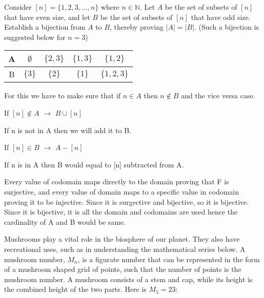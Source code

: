 \documentclass[addpoints]{exam}
\begin{document}
\begin{questions}
\begin{solution}
  
  
  
  
  \end{solution}

\question[15] Consider $[n] = \{1,2,3,...,n\}$ where $n \in \mathbb{N}$. Let $A$ be the set of subsets of $[n]$ that have even size, and let $B$ be the set of subsets of $[n]$ that have odd size. Establish a bijection from $A$ to $B$, thereby proving $|A| = |B|$. (Such a bijection is suggested below for $n = 3$) 

\begin{center}

  \begin{tabular}{ |c || c | c | c |c |}
    \hline
 A & $\emptyset$ & $\{2,3\}$ & $\{1,3\}$ & $\{1,2\}$ \\ \hline
 B & $\{3\}$ & $\{2\}$ & $\{1\}$ & $\{1,2,3\}$\\\hline
\end{tabular}
\end{center}

  \begin{solution} 
  
  For this we have to make sure that if $n \in A$ then $n \notin B$ and the vice versa case.
  
  
  If $[n] \notin A$ $\rightarrow$ $B \cup [n]$
  
  If n is not in A then we will add it to B.
  
  If $[n] \in B$ $\rightarrow$ $A - [n]$
  
  If n is in A then B would equal to [n] subtracted from A.
  
  Every value of codomain maps directly to the domain proving that F is surjective, and every value of domain maps to a specific value in codomain proving it to be injective. Since it is surgective and bijective, so it is bijective. Since it is bijective, it is all the domain and codomains are used hence the cardinality of A and B would be same.
  \end{solution}
  
\question Mushrooms play a vital role in the biosphere of our planet. They also have recreational uses, such as in understanding the mathematical series below. A mushroom number, $M_n$, is a figurate number that can be represented in the form of a mushroom shaped grid of points, such that the number of points is the mushroom number. A mushroom consists of a stem and cap, while its height is the combined height of the two parts. Here is $M_5=23$:


\end{questions}
\end{document}
